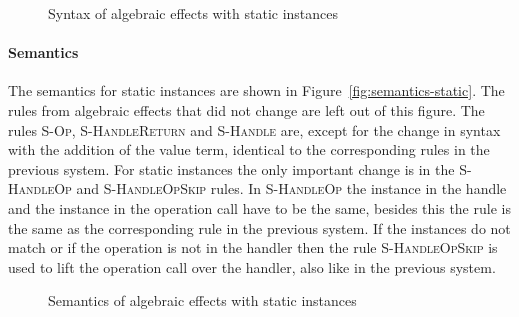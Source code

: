 {\begin{figure}
\caption{Syntax of algebraic effects with static instances}
\centering
{}
\end{figure}

\paragraph{Semantics}
The semantics for static instances are shown in Figure~\ref{fig:semantics-static}. The rules from algebraic effects that did not change are left out of this figure. The rules \textsc{S-Op}, \textsc{S-HandleReturn} and \textsc{S-Handle} are, except for the change in syntax with the addition of the value term, identical to the corresponding rules in the previous system. For static instances the only important change is in the \textsc{S-HandleOp} and \textsc{S-HandleOpSkip} rules. In \textsc{S-HandleOp} the instance in the handle and the instance in the operation call have to be the same, besides this the rule is the same as the corresponding rule in the previous system. If the instances do not match or if the operation is not in the handler then the rule \textsc{S-HandleOpSkip} is used to lift the operation call over the handler, also like in the previous system.

\begin{figure}
\caption{Semantics of algebraic effects with static instances}
\centering
{}
\end{figure}

}
